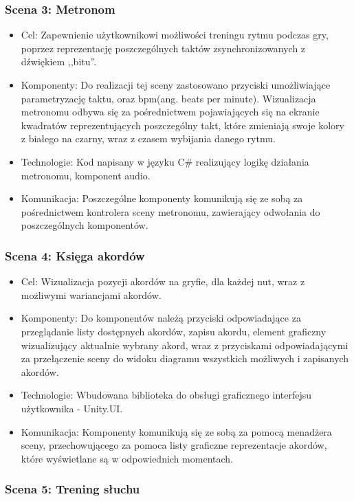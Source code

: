 \subsubsection{Scena 3: Metronom}

\begin{itemize}
\item Cel: Zapewnienie użytkownikowi możliwości treningu rytmu podczas gry, poprzez reprezentację poszczególnych taktów zsynchronizowanych z dźwiękiem ,,bitu''.
\item Komponenty: Do realizacji tej sceny zastosowano przyciski umożliwiające parametryzację taktu, oraz bpm(ang. beats per minute). Wizualizacja metronomu odbywa się za pośrednictwem pojawiających się na ekranie kwadratów reprezentujących poszczególny takt, które zmieniają swoje kolory z białego na czarny, wraz z czasem wybijania danego rytmu.
\item Technologie: Kod napisany w języku C\# realizujący logikę działania metronomu, komponent audio.
\item Komunikacja: Poszczególne komponenty komunikują się ze sobą za pośrednictwem kontrolera sceny metronomu, zawierający odwołania do poszczególnych komponentów.
\end{itemize}

\subsubsection{Scena 4: Księga akordów}

\begin{itemize}
\item Cel: Wizualizacja pozycji akordów na gryfie, dla każdej nut, wraz z możliwymi wariancjami akordów.
\item Komponenty: Do komponentów należą przyciski odpowiadające za przeglądanie listy dostępnych akordów, zapisu akordu, element graficzny wizualizujący aktualnie wybrany akord, wraz z przyciskami odpowiadającymi za przełączenie sceny do widoku diagramu wszystkich możliwych i zapisanych akordów.
\item Technologie: Wbudowana biblioteka do obsługi graficznego interfejsu użytkownika - Unity.UI.
\item Komunikacja: Komponenty komunikują się ze sobą za pomocą menadżera sceny, przechowującego za pomoca listy graficzne reprezentacje akordów, które wyświetlane są w odpowiednich momentach. 
\end{itemize}

\subsubsection{Scena 5: Trening słuchu}

